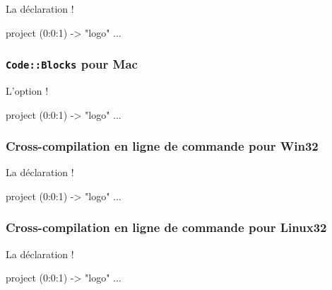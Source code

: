La déclaration \ggs!%
\begin{galgas}
project (0:0:1) -> "logo" {
  ...
}
\end{galgas}

\subsubsection{\texttt{Code{}::Blocks} pour Mac}

L'option \ggs!%
\begin{galgas}
project (0:0:1) -> "logo" {
  ...
}
\end{galgas}

\subsubsection{Cross-compilation en ligne de commande pour Win32}

La déclaration \ggs!%

\begin{galgas}
project (0:0:1) -> "logo" {
  ...
}
\end{galgas}


\subsubsection{Cross-compilation en ligne de commande pour Linux32}

La déclaration \ggs!%

\begin{galgas}
project (0:0:1) -> "logo" {
  ...
}
\end{galgas}


